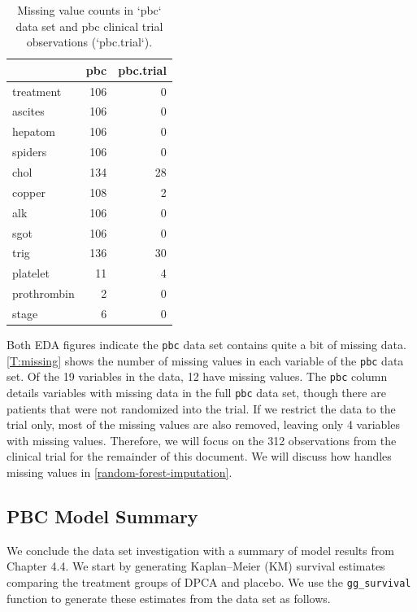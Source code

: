 \documentclass[article, nojss]{jss}
\begin{document}
\begin{table}

\caption{\label{tab:missing}Missing value counts in `pbc` data set and pbc clinical trial observations (`pbc.trial`).\label{T:missing}}
\centering
\begin{tabular}[t]{lrr}
\toprule
  & pbc & pbc.trial\\
\midrule
treatment & 106 & 0\\
ascites & 106 & 0\\
hepatom & 106 & 0\\
spiders & 106 & 0\\
chol & 134 & 28\\
\addlinespace
copper & 108 & 2\\
alk & 106 & 0\\
sgot & 106 & 0\\
trig & 136 & 30\\
platelet & 11 & 4\\
\addlinespace
prothrombin & 2 & 0\\
stage & 6 & 0\\
\bottomrule
\end{tabular}
\end{table}

Both EDA figures indicate the \texttt{pbc} data set contains quite a bit
of missing data. \autoref{T:missing} shows the number of missing values
in each variable of the \texttt{pbc} data set. Of the 19 variables in
the data, 12 have missing values. The \texttt{pbc} column details
variables with missing data in the full \texttt{pbc} data set, though
there are patients that were not randomized into the trial. If we
restrict the data to the trial only, most of the missing values are also
removed, leaving only 4 variables with missing values. Therefore, we
will focus on the 312 observations from the clinical trial for the
remainder of this document. We will discuss how 
handles missing values in \autoref{random-forest-imputation}.

\subsection{PBC Model Summary}\label{pbc-model-summary}

We conclude the data set investigation with a summary
of\citep{fleming:1991} model results from Chapter 4.4. We start by
generating Kaplan--Meier (KM) survival estimates comparing the treatment
groups of DPCA and placebo. We use the 
\texttt{gg\_survival} function to generate these estimates from the data
set as follows.
\end{document}
